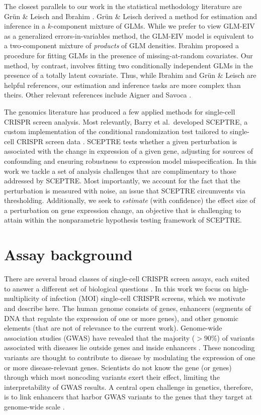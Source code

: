 \documentclass[12pt]{article}
\begin{document}
The closest parallels to our work in the statistical methodology literature are Gr\"{u}n \& Leisch \cite{Grun2008} and Ibrahim \cite{Ibrahim1990}. Gr\"{u}n \& Leisch derived a method for estimation and inference in a $k$-component mixture of GLMs. While we prefer to view GLM-EIV as a generalized errors-in-variables method,  the GLM-EIV model is equivalent to a two-component mixture of \textit{products} of GLM densities. Ibrahim proposed a procedure for fitting GLMs in the presence of missing-at-random covariates. Our method, by contrast, involves fitting two conditionally independent GLMs in the presence of a totally latent covariate. Thus, while Ibrahim and Gr\"{u}n \& Leisch are helpful references, our estimation and inference tasks are more complex than theirs. Other relevant references include Aigner \cite{Aigner1973} and Savoca \cite{Savoca2000}.

The genomics literature has produced a few applied methods for single-cell CRISPR screen analysis. Most relevantly, Barry et al.\ developed SCEPTRE, a custom implementation of the conditional randomization test \parencite{Candes2018, Liu2021} tailored to single-cell CRISPR screen data \parencite{Barry2021}. SCEPTRE tests whether a given perturbation is associated with the change in expression of a given gene, adjusting for sources of confounding and ensuring robustness to expression model misspecification. In this work we tackle a set of analysis challenges that are complimentary to those addressed by SCEPTRE. Most importantly, we account for the fact that the perturbation is measured with noise, an issue that SCEPTRE circumvents via thresholding. Additionally, we seek to \textit{estimate} (with confidence) the effect size of a perturbation on gene expression change, an objective that is challenging to attain within the nonparametric hypothesis testing framework of SCEPTRE.
\fi

\section{Assay background}
There are several broad classes of single-cell CRISPR screen assays, each suited to answer a different set of biological questions \parencite{Gasperini2019,Datlinger2021,Mimitou2019}. In this work we focus on high-multiplicity of infection (MOI) single-cell CRISPR screens, which we motivate and describe here. The human genome consists of genes, enhancers (segments of DNA that regulate the expression of one or more genes), and other genomic elements (that are not of relevance to the current work). Genome-wide association studies (GWAS) have revealed that the majority ($>90\%$) of variants associated with diseases lie outside genes and inside enhancers \parencite{Gallagher2018}. These noncoding variants are thought to contribute to disease by modulating the expression of one or more disease-relevant genes. Scientists do not know the gene (or genes) through which most noncoding variants exert their effect, limiting the interpretability of GWAS results. A central open challenge in genetics, therefore, is to link enhancers that harbor GWAS variants to the genes that they target at genome-wide scale \parencite{Gasperini2020}.
\end{document}
